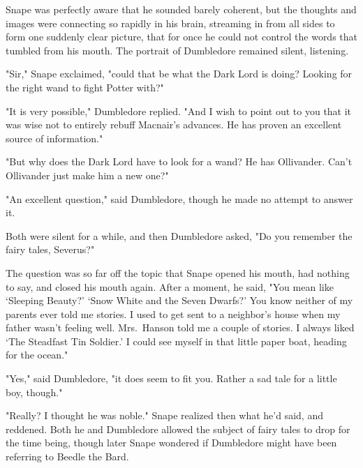 Snape was perfectly aware that he sounded barely coherent, but the thoughts and images were connecting so rapidly in his brain, streaming in from all sides to form one suddenly clear picture, that for once he could not control the words that tumbled from his mouth. The portrait of Dumbledore remained silent, listening.

"Sir," Snape exclaimed, "could that be what the Dark Lord is doing? Looking for the right wand to fight Potter with?"

"It is very possible," Dumbledore replied. "And I wish to point out to you that it was wise not to entirely rebuff Macnair's advances. He has proven an excellent source of information."

"But why does the Dark Lord have to look for a wand? He has Ollivander. Can't Ollivander just make him a new one?"

"An excellent question," said Dumbledore, though he made no attempt to answer it.

Both were silent for a while, and then Dumbledore asked, "Do you remember the fairy tales, Severus?"

The question was so far off the topic that Snape opened his mouth, had nothing to say, and closed his mouth again. After a moment, he said, "You mean like `Sleeping Beauty?' `Snow White and the Seven Dwarfs?' You know neither of my parents ever told me stories. I used to get sent to a neighbor's house when my father wasn't{\el} feeling well. Mrs.~Hanson told me a couple of stories. I always liked `The Steadfast Tin Soldier.' I could see myself in that little paper boat, heading for the ocean."

"Yes," said Dumbledore, "it does seem to fit you. Rather a sad tale for a little boy, though."

"Really? I thought he was noble." Snape realized then what he'd said, and reddened. Both he and Dumbledore allowed the subject of fairy tales to drop for the time being, though later Snape wondered if Dumbledore might have been referring to Beedle the Bard.

